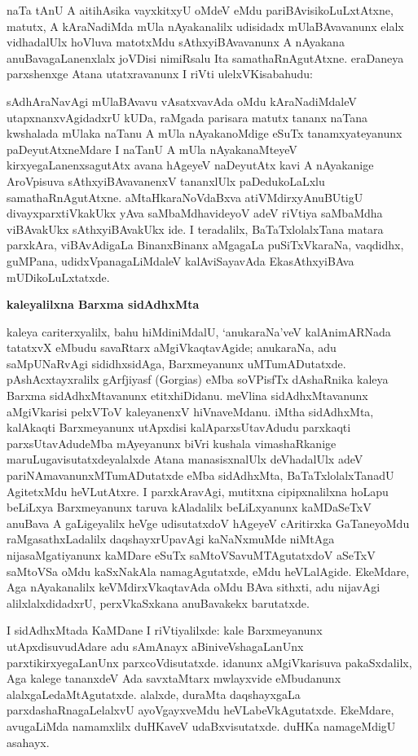 naTa tAnU A aitihAsika vayxkitxyU oMdeV eMdu pariBAvisikoLuLxtAtxne, matutx, A kAraNadiMda mUla nAyakanalilx udisidadx mUlaBAvavanunx elalx vidhadalUlx hoVluva matotxMdu sAthxyiBAvavanunx A nAyakana anuBavagaLanenxlalx joVDisi nimiRsalu Ita samathaRnAgutAtxne. eraDaneya parxshenxge Atana utatxravanunx I riVti ulelxVKisabahudu:

sAdhAraNavAgi mUlaBAvavu vAsatxvavAda oMdu kAraNadiMdaleV utapxnanxvAgi\-dadxrU kUDa, raMgada parisara matutx tananx naTana kwshalada mUlaka naTanu A mUla nAyakanoMdige eSuTx tanamxyateyanunx paDeyutAtxneMdare I naTanU A mUla nAyakanaMteyeV kirxyegaLanenxsagutAtx avana hAgeyeV naDeyutAtx kavi A nAyakanige AroVpisuva sAthxyiBAvavanenxV tananxlUlx paDedukoLaLxlu samathaRnAgutAtxne. aMtaHkaraNoVdaBxva atiVMdirxyAnuBUtigU divayxparxtiVkakUkx yAva saMbaMdhavideyoV adeV riVtiya saMbaMdha viBAvakUkx sAthxyiBAvakUkx ide. I teradalilx, BaTaTxlolalxTana matara parxkAra, viBAvAdigaLa BinanxBinanx aMgagaLa puSiTxVkaraNa, vaqdidhx, guMPana, udidxVpanagaLiMdaleV kalAviSayavAda EkasAthxyiBAva mUDikoLuLxtatxde.

\bigskip
\begin{center}
{\Large\bf kaleyalilxna Barxma sidAdhxMta}
\end{center}

kaleya cariterxyalilx, bahu hiMdiniMdalU, `anukaraNa'veV kalAnimARNada tatatxvX eMbudu savaRtarx aMgiVkaqtavAgide; anukaraNa, adu saMpUNaRvAgi sididhxsidAga, Barxmeyanunx uMTumADutatxde. pAshAcxtayxralilx gArfjiyasf {\rm(Gorgias)} eMba soVPisfTx dAshaRnika kaleya Barxma sidAdhxMtavanunx etitxhiDidanu. meVlina sidAdhxMtavanunx aMgiVkarisi pelxVToV kaleyanenxV hiVnaveMdanu. iMtha sidAdhxMta, kalAkaqti Barxmeyanunx utApxdisi kalAparxsUtavAdudu parxkaqti parxsUtavAdudeMba mAyeyanunx biVri kushala vimashaRkanige maruLugavisutatxdeyalalxde Atana manasisxnalUlx deVhadalUlx adeV pariNAmavanunxMTumADutatxde eMba sidAdhxMta, BaTaTxlolalxTanadU AgitetxMdu heVLutAtxre. I parxkAravAgi, mutitxna cipipxnalilxna hoLapu beLiLxya Barxmeyanunx taruva kAladalilx beLiLxyanunx kaMDaSeTxV anuBava A gaLigeyalilx heVge udisutatxdoV hAgeyeV cAritirxka GaTaneyoMdu raMgasathxLadalilx daqshayxrUpavAgi kaNaNxmuMde niMtAga nijasaMgatiyanunx kaMDare eSuTx saMtoVSavuMTAgutatxdoV aSeTxV saMtoVSa oMdu kaSxNakAla namagAgutatxde, eMdu heVLalAgide. EkeMdare, Aga nAyakanalilx keVMdirxVkaqtavAda oMdu BAva sithxti, adu nijavAgi alilxlalxdidadxrU, perxVkaSxkana anuBavakekx barutatxde.

I sidAdhxMtada KaMDane I riVtiyalilxde: kale Barxmeyanunx utApxdisuvudAdare adu sAmAnayx aBiniveVshagaLanUnx parxtikirxyegaLanUnx parxcoVdisutatxde. idanunx aMgiVkarisuva pakaSxdalilx, Aga kalege tananxdeV Ada savxtaMtarx mwlayxvide eMbudanunx alalxgaLedaMtAgutatxde. alalxde, duraMta daqshayxgaLa parxdashaRnagaLelalxvU ayoVgayxveMdu heVLabeVkAgutatxde. EkeMdare, avugaLiMda namamxlilx duHKaveV udaBxvisutatxde. duHKa namageMdigU asahayx.

